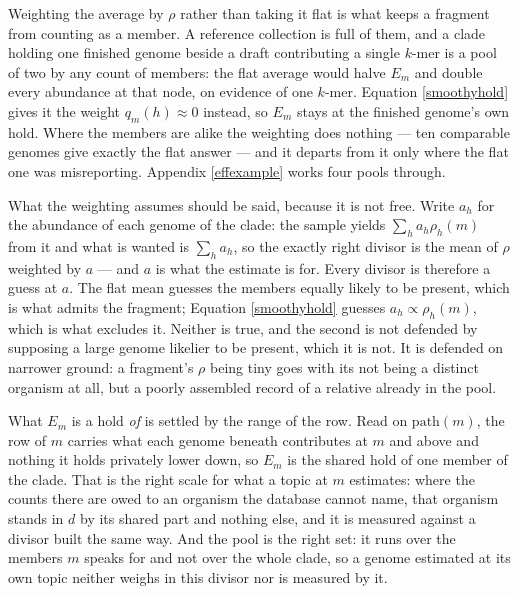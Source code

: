 \documentclass[pdflatex,sn-vancouver-num]{sn-jnl}
\begin{document}
    Weighting the average by $\rho$ rather than taking it flat is what keeps a fragment from counting
    as a member. A reference collection is full of them, and a clade holding one finished genome
    beside a draft contributing a single $k$-mer is a pool of two by any count of members: the flat
    average would halve $E_m$ and double every abundance at that node, on evidence of one $k$-mer.
    Equation \eqref{smoothyhold} gives it the weight $q_m(h) \approx 0$ instead, so $E_m$ stays at
    the finished genome's own hold. Where the members are alike the weighting does nothing --- ten
    comparable genomes give exactly the flat answer --- and it departs from it only where the flat
    one was misreporting. Appendix \ref{effexample} works four pools through.

    What the weighting assumes should be said, because it is not free. Write $a_h$ for the abundance
    of each genome of the clade: the sample yields $\sum_h a_h \rho_h(m)$ from it and what is wanted is
    $\sum_h a_h$, so the exactly right divisor is the mean of $\rho$ weighted by $a$ --- and $a$ is
    what the estimate is for. Every divisor is therefore a guess at $a$. The flat mean guesses the
    members equally likely to be present, which is what admits the fragment;
    Equation \eqref{smoothyhold} guesses $a_h \propto \rho_h(m)$, which is what excludes it. Neither is
    true, and the second is not defended by supposing a large genome likelier to be present, which it
    is not. It is defended on narrower ground: a fragment's $\rho$ being tiny goes with its not being
    a distinct organism at all, but a poorly assembled record of a relative already in the pool.

    What $E_m$ is a hold \emph{of} is settled by the range of the row. Read on $\mathrm{path}(m)$,
    the row of $m$ carries what each genome beneath contributes at $m$ and above and nothing it holds
    privately lower down, so $E_m$ is the shared hold of one member of the clade. That is the right
    scale for what a topic at $m$ estimates: where the counts there are owed to an organism the
    database cannot name, that organism stands in $d$ by its shared part and nothing else, and it is
    measured against a divisor built the same way. And the pool is the right set: it runs over the
    members $m$ speaks for and not over the whole clade, so a genome estimated at its own topic
    neither weighs in this divisor nor is measured by it.
\end{document}
